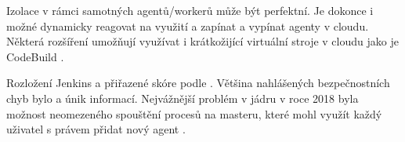         Izolace v rámci samotných agentů/workerů může být perfektní. Je dokonce i možné dynamicky reagovat na využití a zapínat a vypínat agenty v cloudu. Některá rozšíření umožňují využívat i krátkožijící virtuální stroje v cloudu jako je  CodeBuild \cite{jenkins-codebuild}.

        \begin{iffigure}
            \centering
            \caption{Rozložení Jenkins  a přiřazené skóre podle . Většina nahlášených bezpečnostních chyb bylo  a únik informací. Nejvážnější problém v jádru v roce 2018 byla možnost neomezeného spouštění procesů na masteru, které mohl využít každý uživatel s právem přidat nový agent \cite{cve-jenkins}.}
            \label{fig:gitlab-review-cycle}
        \end{iffigure}

